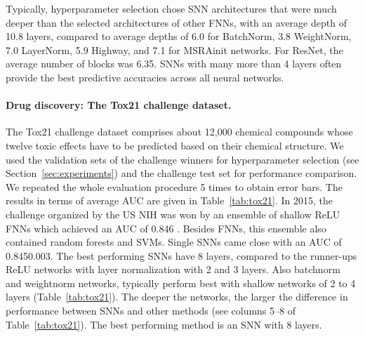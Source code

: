 \documentclass{article}
\begin{document}
Typically, hyperparameter selection chose SNN architectures that were
much deeper than the selected architectures of other FNNs, with an average depth of 10.8 layers, 
compared to average depths of 6.0 for BatchNorm, 3.8 WeightNorm, 7.0 LayerNorm, 5.9 Highway,  
and 7.1 for MSRAinit networks. For ResNet, the average number of blocks was 6.35. 
SNNs with many more than 4 layers often provide the best predictive accuracies across all neural networks. 
























\paragraph{Drug discovery: The Tox21 challenge dataset.} 
The Tox21 challenge dataset comprises about 12,000 chemical compounds
whose twelve toxic effects have to be predicted based on their chemical structure. 
We used the validation sets 
of the challenge winners for hyperparameter selection (see Section~\ref{sec:experiments}) and 
the challenge test set for performance comparison. 
We repeated the whole evaluation procedure 5 times 
to obtain error bars. 
The results in terms of average AUC are given in Table~\ref{tab:tox21}.
In 2015, the challenge organized by the US NIH 
was won by an ensemble of shallow ReLU FNNs which achieved an AUC of 0.846 \citep{bib:Mayr2016}.
Besides FNNs, this ensemble also contained random forests and SVMs.
Single SNNs came close with an AUC of 0.8450.003.
The best performing SNNs have 8 layers, compared to the runner-ups ReLU networks with layer normalization with 2 and 3 layers. 
Also batchnorm and weightnorm networks, typically perform best with shallow
networks of 2 to 4 layers (Table~\ref{tab:tox21}). The deeper the networks, the 
larger the difference in performance between SNNs and other methods (see columns 5--8 of Table~\ref{tab:tox21}).
The best performing method is an SNN with 8 layers.
\end{document}
